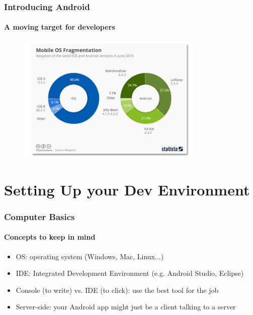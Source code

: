\documentclass{beamer}
\begin{document}
	\begin{frame}
	\frametitle{Introducing Android}
	\framesubtitle{A moving target for developers}
	        \begin{figure}[h]
                \centering
                \includegraphics[width=0.8\textwidth]{./images/syme-ios-v-android}
        	\end{figure}
	\end{frame}

	
\section[Section]{Setting Up your Dev Environment}
	\begin{frame}
	\frametitle{Computer Basics}
	\framesubtitle{Concepts to keep in mind}
	\begin{itemize}
		\item OS: operating system (Windows, Mac, Linux...)
		\item IDE: Integrated Development Environment (e.g. Android Studio, Eclipse)
		\item Console (to write) vs. IDE (to click): use the best tool for the job
		\item Server-side: your Android app might just be a client talking to a server
	\end{itemize}
	\end{frame}
\end{document}
